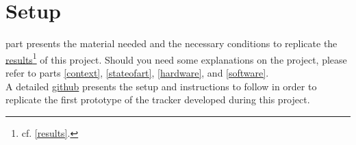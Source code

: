 \chapter{Setup}\label{setup}

	 part presents the material needed and the 
	necessary conditions to replicate the \hyperref[results]{results}\footnote{cf. \vref{results}.} of
	this project. Should you need some explanations on the project, please
	refer to parts \vref{context}, \vref{stateofart}, \vref{hardware}, and \vref{software}.
	\\\indent A detailed \href{https://github.com/klipfel/tracker-v1}{github} presents the setup and
	instructions to follow in order to replicate the first prototype of the tracker developed during 
	this project.
	                           


